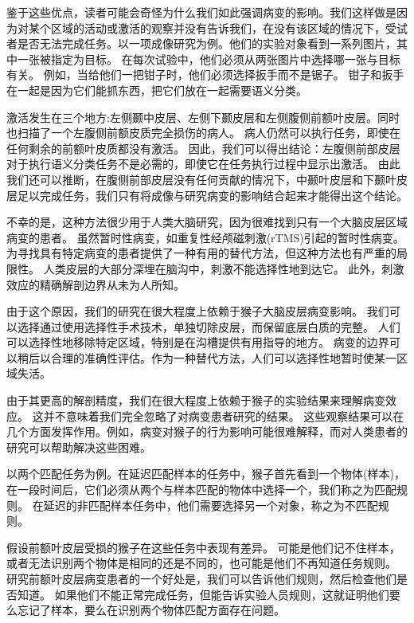 \par
鉴于这些优点，读者可能会奇怪为什么我们如此强调病变的影响。我们这样做是因为对某个区域的活动或激活的观察并没有告诉我们，在没有该区域的情况下，受试者是否无法完成任务。以一项成像研究为例\cite{price1999delineating}。他们的实验对象看到一系列图片，其中一张被指定为目标。
在每次试验中，他们必须从两张图片中选择哪一张与目标有关。
例如，当给他们一把钳子时，他们必须选择扳手而不是锯子。
钳子和扳手在一起是因为它们能抓东西，把它们放在一起需要语义分类。


\par
激活发生在三个地方:左侧颞中皮层、左侧下颞皮层和左侧腹侧前额叶皮层。同时也扫描了一个左腹侧前额皮质完全损伤的病人\cite{price1999delineating}。
病人仍然可以执行任务，即使在任何剩余的前额叶皮质都没有激活。
因此，我们可以得出结论：左腹侧前部皮层对于执行语义分类任务不是必需的，即使它在任务执行过程中显示出激活。
由此我们还可以推断，在腹侧前部皮层没有任何贡献的情况下，中颞叶皮层和下颞叶皮层足以完成任务，我们只有将成像与研究病变的影响结合起来才能得出这个结论。


\par
不幸的是，这种方法很少用于人类大脑研究，因为很难找到只有一个大脑皮层区域病变的患者。
虽然暂时性病变，如重复性经颅磁刺激(rTMS)引起的暂时性病变。
为寻找具有特定病变的患者提供了一种有用的替代方法，但这种方法也有严重的局限性。
人类皮层的大部分深埋在脑沟中，刺激不能选择性地到达它。
此外，刺激效应的精确解剖边界从未为人所知。


\par
由于这个原因，我们的研究在很大程度上依赖于猴子大脑皮层病变影响。
我们可以选择通过使用选择性手术技术，单独切除皮层，而保留底层白质的完整。
人们可以选择性地移除特定区域，特别是在沟槽提供有用指导的地方。
病变的边界可以稍后以合理的准确性评估。作为一种替代方法，人们可以选择性地暂时使某一区域失活。
\par

由于其更高的解剖精度，我们在很大程度上依赖于猴子的实验结果来理解病变效应。
这并不意味着我们完全忽略了对病变患者研究的结果。
这些观察结果可以在几个方面发挥作用。例如，病变对猴子的行为影响可能很难解释，而对人类患者的研究可以帮助解决这些困难。

\par
以两个匹配任务为例。在延迟匹配样本的任务中，猴子首先看到一个物体(样本)，在一段时间后，它们必须从两个与样本匹配的物体中选择一个，我们称之为匹配规则。
在延迟的非匹配样本任务中，他们需要选择另一个对象，称之为不匹配规则。

\par
假设前额叶皮层受损的猴子在这些任务中表现有差异。
可能是他们记不住样本，或者无法识别两个物体是相同的还是不同的，也可能是他们不再知道任务规则。
研究前额叶皮层病变患者的一个好处是，我们可以告诉他们规则，然后检查他们是否知道。
如果他们不能正常完成任务，但能告诉实验人员规则，这就证明他们要么忘记了样本，要么在识别两个物体匹配方面存在问题。

